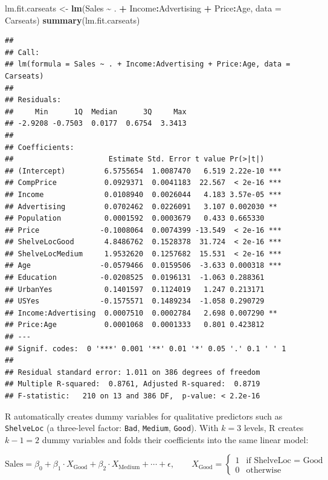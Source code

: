 \documentclass[
  11pt,
]{article}
\newenvironment{Shaded}{\begin{snugshade}}{\end{snugshade}}
\newcommand{\AttributeTok}[1]{\textcolor[rgb]{0.13,0.29,0.53}{#1}}
\newcommand{\FunctionTok}[1]{\textcolor[rgb]{0.13,0.29,0.53}{\textbf{#1}}}
\newcommand{\NormalTok}[1]{#1}
\newcommand{\OtherTok}[1]{\textcolor[rgb]{0.56,0.35,0.01}{#1}}
\newcommand{\SpecialCharTok}[1]{\textcolor[rgb]{0.81,0.36,0.00}{\textbf{#1}}}
\begin{document}
\begin{Shaded}
\begin{Highlighting}[]
\NormalTok{lm.fit.carseats }\OtherTok{\textless{}{-}} \FunctionTok{lm}\NormalTok{(Sales }\SpecialCharTok{\textasciitilde{}}\NormalTok{ . }\SpecialCharTok{+}\NormalTok{ Income}\SpecialCharTok{:}\NormalTok{Advertising }\SpecialCharTok{+}\NormalTok{ Price}\SpecialCharTok{:}\NormalTok{Age,}
                       \AttributeTok{data =}\NormalTok{ Carseats)}
\FunctionTok{summary}\NormalTok{(lm.fit.carseats)}
\end{Highlighting}
\end{Shaded}

\begin{verbatim}
## 
## Call:
## lm(formula = Sales ~ . + Income:Advertising + Price:Age, data = Carseats)
## 
## Residuals:
##     Min      1Q  Median      3Q     Max 
## -2.9208 -0.7503  0.0177  0.6754  3.3413 
## 
## Coefficients:
##                      Estimate Std. Error t value Pr(>|t|)    
## (Intercept)         6.5755654  1.0087470   6.519 2.22e-10 ***
## CompPrice           0.0929371  0.0041183  22.567  < 2e-16 ***
## Income              0.0108940  0.0026044   4.183 3.57e-05 ***
## Advertising         0.0702462  0.0226091   3.107 0.002030 ** 
## Population          0.0001592  0.0003679   0.433 0.665330    
## Price              -0.1008064  0.0074399 -13.549  < 2e-16 ***
## ShelveLocGood       4.8486762  0.1528378  31.724  < 2e-16 ***
## ShelveLocMedium     1.9532620  0.1257682  15.531  < 2e-16 ***
## Age                -0.0579466  0.0159506  -3.633 0.000318 ***
## Education          -0.0208525  0.0196131  -1.063 0.288361    
## UrbanYes            0.1401597  0.1124019   1.247 0.213171    
## USYes              -0.1575571  0.1489234  -1.058 0.290729    
## Income:Advertising  0.0007510  0.0002784   2.698 0.007290 ** 
## Price:Age           0.0001068  0.0001333   0.801 0.423812    
## ---
## Signif. codes:  0 '***' 0.001 '**' 0.01 '*' 0.05 '.' 0.1 ' ' 1
## 
## Residual standard error: 1.011 on 386 degrees of freedom
## Multiple R-squared:  0.8761, Adjusted R-squared:  0.8719 
## F-statistic:   210 on 13 and 386 DF,  p-value: < 2.2e-16
\end{verbatim}

R automatically creates dummy variables for qualitative predictors such
as \texttt{ShelveLoc} (a three-level factor: \texttt{Bad},
\texttt{Medium}, \texttt{Good}). With \(k=3\) levels, R creates
\(k-1=2\) dummy variables and folds their coefficients into the same
linear model:

\[
\text{Sales} = \beta_0 + \beta_1 \cdot X_{\text{Good}} + \beta_2 \cdot X_{\text{Medium}} + \cdots + \epsilon,
\qquad X_{\text{Good}} =
\begin{cases} 1 & \text{if ShelveLoc = Good} \\ 0 & \text{otherwise} \end{cases}
\]
\end{document}
